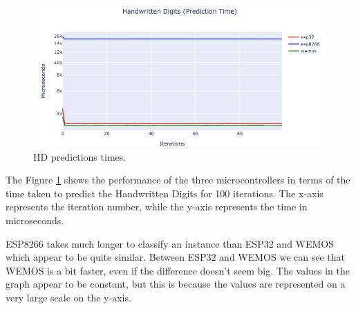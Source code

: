 \documentclass{article}
\begin{document}
\begin{minipage}{0.69\textwidth}
    \begin{figure}[H]
        \centering
        \includegraphics[scale=0.45]{HD-PredictionsTimes.png}
        \caption{HD predictions times.}
        \label{fig:7}
    \end{figure}
\end{minipage}
\hfill
\begin{minipage}{0.3\textwidth}
    \begin{table}[H]
        \caption{HD descriptive statistics.}    
        \centering
        \label{tab:3}
    \end{table}
\end{minipage}
\break

The Figure \ref{fig:7} shows the performance of the three microcontrollers in terms of the time taken to predict the Handwritten Digits for 100 iterations. The x-axis represents the iteration number, while the y-axis represents the time in microseconds.

ESP8266 takes much longer to classify an instance than ESP32 and WEMOS which appear to be quite similar. Between ESP32 and WEMOS we can see that WEMOS is a bit faster, even if the difference doesn't seem big. The values in the graph appear to be constant, but this is because the values are represented on a very large scale on the y-axis.
\end{document}
